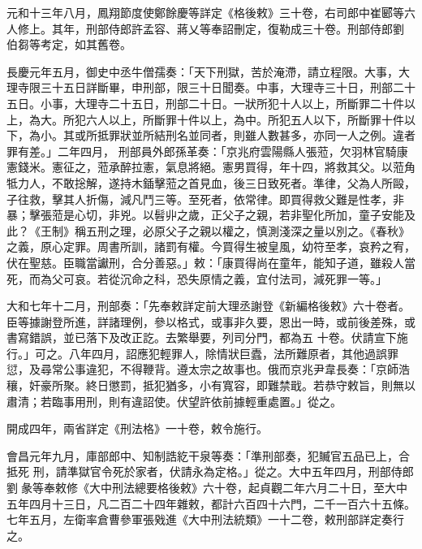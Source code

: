 \begin{pinyinscope}
 元和十三年八月，鳳翔節度使鄭餘慶等詳定《格後敕》三十卷，右司郎中崔郾等六人修上。其年，刑部侍郎許孟容、蔣乂等奉詔刪定，復勒成三十卷。刑部侍郎劉
 伯芻等考定，如其舊卷。



 長慶元年五月，御史中丞牛僧孺奏：「天下刑獄，苦於淹滯，請立程限。大事，大理寺限三十五日詳斷畢，申刑部，限三十日聞奏。中事，大理寺三十日，刑部二十五日。小事，大理寺二十五日，刑部二十日。一狀所犯十人以上，所斷罪二十件以上，為大。所犯六人以上，所斷罪十件以上，為中。所犯五人以下，所斷罪十件以下，為小。其或所抵罪狀並所結刑名並同者，則雖人數甚多，亦同一人之例。違者罪有差。」二年四月，
 刑部員外郎孫革奏：「京兆府雲陽縣人張蒞，欠羽林官騎康憲錢米。憲征之，蒞承醉拉憲，氣息將絕。憲男買得，年十四，將救其父。以蒞角牴力人，不敢捴解，遂持木鍤擊蒞之首見血，後三日致死者。準律，父為人所毆，子往救，擊其人折傷，減凡鬥三等。至死者，依常律。即買得救父難是性孝，非暴；擊張蒞是心切，非兇。以髫丱之歲，正父子之親，若非聖化所加，童子安能及此？《王制》稱五刑之理，必原父子之親以權之，慎測淺深之量以別之。《春秋》
 之義，原心定罪。周書所訓，諸罰有權。今買得生被皇風，幼符至孝，哀矜之宥，伏在聖慈。臣職當讞刑，合分善惡。」敕：「康買得尚在童年，能知子道，雖殺人當死，而為父可哀。若從沉命之科，恐失原情之義，宜付法司，減死罪一等。」



 大和七年十二月，刑部奏：「先奉敕詳定前大理丞謝登《新編格後敕》六十卷者。臣等據謝登所進，詳諸理例，參以格式，或事非久要，恩出一時，或前後差殊，或書寫錯誤，並已落下及改正訖。去繁舉要，列司分門，都為五
 十卷。伏請宣下施行。」可之。八年四月，詔應犯輕罪人，除情狀巨蠹，法所難原者，其他過誤罪愆，及尋常公事違犯，不得鞭背。遵太宗之故事也。俄而京兆尹韋長奏：「京師浩穰，奸豪所聚。終日懲罰，抵犯猶多，小有寬容，即難禁戢。若恭守敕旨，則無以肅清；若臨事用刑，則有違詔使。伏望許依前據輕重處置。」從之。



 開成四年，兩省詳定《刑法格》一十卷，敕令施行。



 會昌元年九月，庫部郎中、知制誥紇干泉等奏：「準刑部奏，犯贓官五品已上，合抵死
 刑，請準獄官令死於家者，伏請永為定格。」從之。大中五年四月，刑部侍郎劉彖等奉敕修《大中刑法總要格後敕》六十卷，起貞觀二年六月二十日，至大中五年四月十三日，凡二百二十四年雜敕，都計六百四十六門，二千一百六十五條。七年五月，左衛率倉曹參軍張戣進《大中刑法統類》一十二卷，敕刑部詳定奏行之。



\end{pinyinscope}